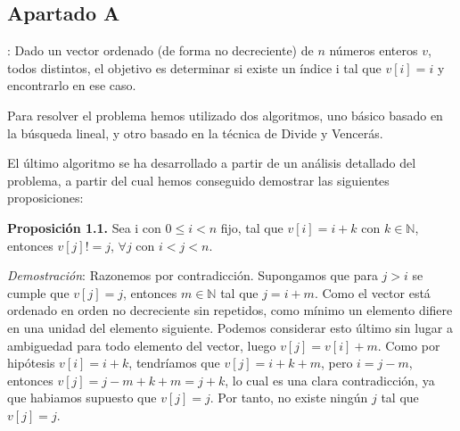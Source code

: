\subsection{Apartado A}

: Dado un vector ordenado (de forma no decreciente) de $n$ números enteros $v$, todos 
distintos, el objetivo es determinar si existe un índice i tal que $v[i] = i$ y 
encontrarlo en ese caso. 

Para resolver el problema hemos utilizado dos algoritmos, uno básico basado en 
la búsqueda lineal, y otro basado en la técnica de Divide y Vencerás. 

El último algoritmo se ha desarrollado a partir de un análisis detallado del 
problema, a partir del cual hemos conseguido demostrar las siguientes proposiciones:

\textbf{Proposición 1.1.} Sea i con $0 \leqslant i < n$ fijo, tal que $v[i]=i+k$ con 
$k \in \mathbb N$, entonces $v[j]!=j$, $\forall j$ con $i < j < n$. 

\textit{Demostración}: Razonemos por contradicción. Supongamos que para $j > i$ se 
cumple que $v[j]=j$, entonces \exists $m \in \mathbb N$ tal que $j=i+m$. Como el 
vector está ordenado en orden no decreciente sin repetidos, como mínimo un elemento
difiere en una unidad del elemento siguiente. Podemos considerar esto último sin 
lugar a ambiguedad para todo elemento del vector, luego $v[j]=v[i]+m$. Como por hipótesis
$v[i]=i+k$, tendríamos que $v[j]=i+k+m$, pero $i=j-m$, entonces $v[j]=j-m+k+m=j+k$, lo
cual es una clara contradicción, ya que habiamos supuesto que $v[j]=j$. Por tanto, no 
existe ningún $j$ tal que $v[j]=j$.





